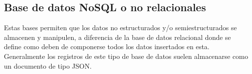 \documentclass[12pt, a4paper, titlepage]{report}
\begin{document}
			\subsection{Base de datos NoSQL o no relacionales}
			Estas bases permiten que los datos no estructurados y/o semiestructurados se almacenen y manipulen, a diferencia de la base de datos relacional donde se define como deben de componerse todos los datos insertados en esta. Generalmente los registros de este tipo de base de datos suelen almacenarse como un documento de tipo JSON.\par
\end{document}
